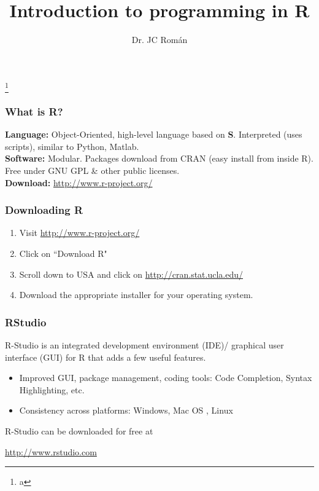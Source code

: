 \documentclass{beamer}
\title[Introduction to R]{Introduction to programming in R}
\author{Dr. JC Rom{\'a}n}
\institute{SDSU Mathematics and Statistics}
\date{}
\begin{document}
	

\begin{frame}[plain]
	\titlepage
	
	\footnote{a}
\end{frame}

\begin{frame}[fragile]\frametitle{What is R?}
	
	\textbf{Language:} Object-Oriented, high-level language based on \textbf{S}. Interpreted (uses scripts), similar to Python, Matlab. \\
	
	\textbf{Software:} Modular. Packages download from CRAN (easy install from inside R). Free under GNU GPL \& other public licenses.\\
	
	\textbf{Download:} \url{http://www.r-project.org/}
	
\end{frame}

\begin{frame}\frametitle{Downloading R}
	\begin{enumerate}		
		\item Visit \url{http://www.r-project.org/}
		\item Click on ``Download R"
		\item Scroll down to USA and click on \url{http://cran.stat.ucla.edu/}
		\item Download the appropriate installer for your operating system.
	\end{enumerate}
\end{frame}

\begin{frame}[fragile]\frametitle{RStudio} 
	R-Studio is an integrated development environment (IDE)/ graphical user interface (GUI) for R that adds a few useful features.
	\begin{itemize}
		\item Improved GUI, package management, coding tools: Code Completion, Syntax Highlighting, etc.
		\item Consistency across platforms: Windows, Mac OS , Linux
	\end{itemize}
	R-Studio can be downloaded for free at
	\begin{center}
		\url{http://www.rstudio.com}\\
	\end{center}
\end{frame}
\end{document}
